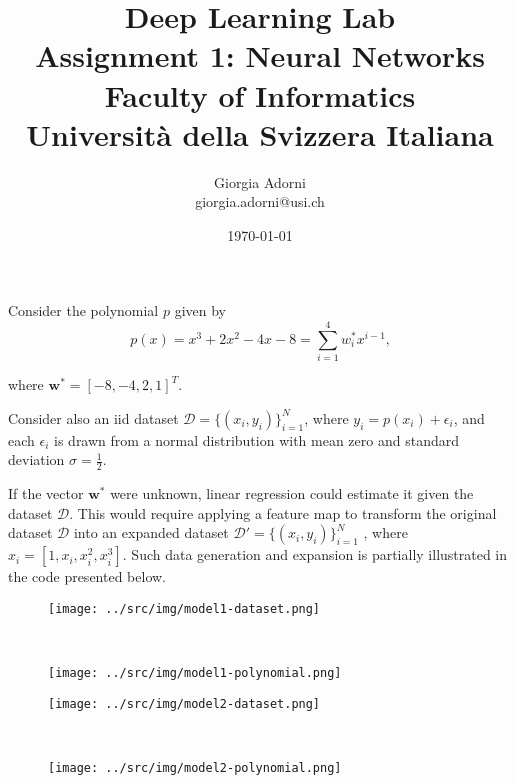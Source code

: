 \documentclass[12pt]{article}
\title{Deep Learning Lab \\ \Large{Assignment 1: Neural Networks} \\[0.3em] \normalsize{Faculty of Informatics} \\ \normalsize{Università della Svizzera Italiana}}
\author {{Giorgia Adorni}	\\ \normalsize{giorgia.adorni@usi.ch}}
\date{\today}
\begin{document}
 
	
	
	\maketitle 
	
	Consider the polynomial $p$ given by
	\begin{equation*}
	 p(x)=x^3+2x^2-4x-8=\sum_{i=1}^4 w_i^*x^{i-1} \mbox{,}
	\end{equation*} 
	
	where $\textbf{w}^*=[-8,-4,2,1]^T$.
	
	Consider also an iid dataset $\mathcal{D} = \{(x_i, y_i)\}^N_{i=1}$, where $y_i = p(x_i)+\epsilon_i$, and each $\epsilon_i$ is drawn from a normal distribution with mean zero and standard deviation $\sigma = \frac{1}{2}$.
	
	If the vector $\textbf{w}^*$ were unknown, linear regression could estimate it given the dataset $\mathcal{D}$. This would require applying a feature map to transform the
	original dataset $\mathcal{D}$ into an expanded dataset $\mathcal{D}'= \{(x_i, y_i)\}^N_{i=1}$ , where $x_i = [1,x_i,x_i^2,x_i^3]$.
	Such data generation and expansion is partially illustrated in the code presented below.
	
	
	\begin{figure}
		\begin{minipage}[c]{.5\textwidth}
		\centering
		\texttt{[image: ../src/img/model1-dataset.png]}
		\label{fig:model1-dataset}
		\end{minipage}
		~
		\begin{minipage}[c]{.5\textwidth}
			\centering
			\texttt{[image: ../src/img/model1-polynomial.png]}
			\label{fig:model1-polynomial}
		\end{minipage}
	\end{figure}

		\begin{figure}
		\begin{minipage}[c]{.5\textwidth}
			\centering
			\texttt{[image: ../src/img/model2-dataset.png]}
			\label{fig:model2-dataset}
		\end{minipage}
		~
		\begin{minipage}[c]{.5\textwidth}
			\centering
			\texttt{[image: ../src/img/model2-polynomial.png]}
			\label{fig:model2-polynomial}
		\end{minipage}
	\end{figure}
\end{document}
